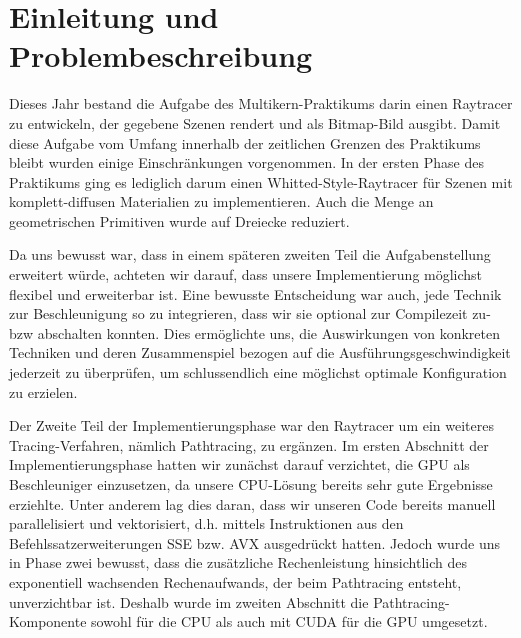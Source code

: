 \section{Einleitung und Problembeschreibung}


Dieses Jahr bestand die Aufgabe des Multikern-Praktikums darin einen Raytracer zu entwickeln, der gegebene Szenen rendert und als Bitmap-Bild ausgibt.
Damit diese Aufgabe vom Umfang innerhalb der zeitlichen Grenzen des Praktikums bleibt wurden einige Einschränkungen vorgenommen.
In der ersten Phase des Praktikums ging es lediglich darum einen Whitted-Style-Raytracer für Szenen mit komplett-diffusen Materialien zu implementieren.
Auch die Menge an geometrischen Primitiven wurde auf Dreiecke reduziert.

Da uns bewusst war, dass in einem späteren zweiten Teil die Aufgabenstellung erweitert würde, achteten wir darauf, dass unsere Implementierung möglichst flexibel und erweiterbar ist.
Eine bewusste Entscheidung war auch, jede Technik zur Beschleunigung so zu integrieren, dass wir sie optional zur Compilezeit zu- bzw abschalten konnten.
Dies ermöglichte uns, die Auswirkungen von konkreten Techniken und deren Zusammenspiel bezogen auf die Ausführungsgeschwindigkeit jederzeit zu überprüfen, um schlussendlich eine möglichst optimale Konfiguration zu erzielen.

Der Zweite Teil der Implementierungsphase war den Raytracer um ein weiteres Tracing-Verfahren, nämlich Pathtracing, zu ergänzen.
Im ersten Abschnitt der Implementierungsphase hatten wir zunächst darauf verzichtet, die GPU als Beschleuniger einzusetzen, da unsere CPU-Lösung bereits sehr gute Ergebnisse erziehlte.
Unter anderem lag dies daran, dass wir unseren Code bereits manuell parallelisiert und vektorisiert, d.h. mittels Instruktionen aus den Befehlssatzerweiterungen SSE bzw. AVX ausgedrückt hatten.
Jedoch wurde uns in Phase zwei bewusst, dass die zusätzliche Rechenleistung hinsichtlich des exponentiell wachsenden Rechenaufwands, der beim Pathtracing entsteht, unverzichtbar ist. 
Deshalb wurde im zweiten Abschnitt die Pathtracing-Komponente sowohl für die CPU als auch mit CUDA für die GPU umgesetzt.
